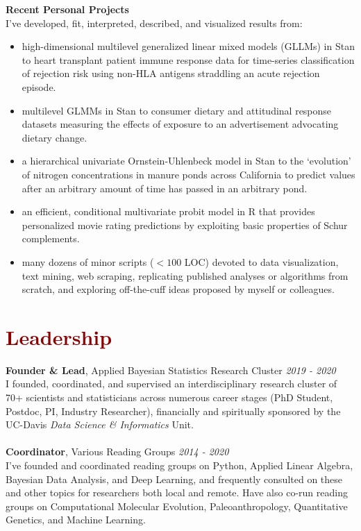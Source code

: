 \documentclass[11pt,margin,line]{resume}
\begin{document}
\begin{resume}
\textbf{Recent Personal Projects}\\
I've developed, fit, interpreted, described, and visualized results from:
\begin{itemize}[noitemsep]
\item high-dimensional multilevel generalized linear mixed models (GLLMs) in Stan to heart transplant patient immune response data for time-series classification of rejection risk using non-HLA antigens straddling an acute rejection episode.
\item multilevel GLMMs in Stan to consumer dietary and attitudinal response datasets measuring the effects of exposure to an advertisement advocating dietary change.
\item a hierarchical univariate Ornstein-Uhlenbeck model in Stan to the `evolution' of nitrogen concentrations in manure ponds across California to predict values after an arbitrary amount of time has passed in an arbitrary pond.
\item an efficient, conditional multivariate probit model in R that provides personalized movie rating predictions by exploiting basic properties of Schur complements.
\item many dozens of minor scripts ($<100$ LOC) devoted to data visualization, text mining, web scraping, replicating published analyses or algorithms from scratch, and exploring off-the-cuff ideas proposed by myself or colleagues.
\end{itemize}
\vspace{-1.5mm}

\section{\large\textcolor{DarkRed}{Leadership}}

\textbf{Founder \& Lead}, Applied Bayesian Statistics Research Cluster \hfill \emph{2019 - 2020}\\
I founded, coordinated, and supervised an interdisciplinary research cluster of 70+ scientists and statisticians across numerous career stages (PhD Student, Postdoc, PI, Industry Researcher), financially and spiritually sponsored by the UC-Davis \emph{Data Science \& Informatics} Unit.\\\\
\textbf{Coordinator}, Various Reading Groups \hfill \emph{2014 - 2020}\\
I've founded and coordinated reading groups on Python, Applied Linear Algebra, Bayesian Data Analysis, and Deep Learning, and frequently consulted on these and other topics for researchers both local and remote. Have also co-run reading groups on Computational Molecular Evolution, Paleoanthropology, Quantitative Genetics, and Machine Learning.
\vspace{-1.5mm}


\end{resume}
\end{document}

